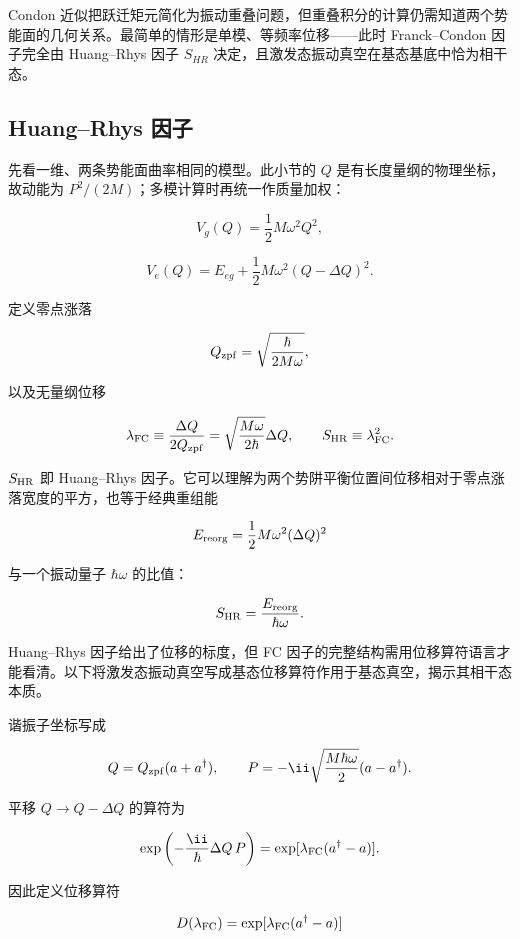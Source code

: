 Condon 近似把跃迁矩元简化为振动重叠问题，但重叠积分的计算仍需知道两个势能面的几何关系。最简单的情形是单模、等频率位移——此时 Franck--Condon 因子完全由 Huang--Rhys 因子 $S_{HR}$ 决定，且激发态振动真空在基态基底中恰为相干态。

\subsection{Huang--Rhys 因子}
先看一维、两条势能面曲率相同的模型。此小节的 $Q$ 是有长度量纲的物理坐标，故动能为 $P^2/(2M)$；多模计算时再统一作质量加权：

\[
V_g(Q)=\frac12M\omega^2Q^2,
\]

\[
V_e(Q)=E_{eg}+\frac12M\omega^2(Q-\Delta Q)^2.
\]

定义零点涨落

\[
Q_{\rm zpf}=\sqrt{\frac{\hbar}{2M\omega}},
\]

以及无量纲位移

\begin{equation}
\lambda_{\rm FC}
\equiv\frac{\Delta Q}{2Q_{\rm zpf}}
=\sqrt{\frac{M\omega}{2\hbar}}\Delta Q,
\qquad
S_{\rm HR}\equiv\lambda_{\rm FC}^2.
\label{eq:huang-rhys}
\end{equation}

\(S_{\rm HR}\) 即 Huang--Rhys 因子。它可以理解为两个势阱平衡位置间位移相对于零点涨落宽度的平方，也等于经典重组能

\[
E_{\rm reorg}=\frac12M\omega^2(\Delta Q)^2
\]

与一个振动量子 \(\hbar\omega\) 的比值：

\[
S_{\rm HR}=\frac{E_{\rm reorg}}{\hbar\omega}.
\]

Huang--Rhys 因子给出了位移的标度，但 FC 因子的完整结构需用位移算符语言才能看清。以下将激发态振动真空写成基态位移算符作用于基态真空，揭示其相干态本质。

谐振子坐标写成

\[
Q=Q_{\rm zpf}(a+a^\dagger),
\qquad
P=-\ii\sqrt{\frac{M\hbar\omega}{2}}(a-a^\dagger).
\]

平移 \(Q\to Q-\Delta Q\) 的算符为

\[
\exp\left(-\frac{\ii}{\hbar}\Delta Q\,P\right)
=\exp[\lambda_{\rm FC}(a^\dagger-a)].
\]

因此定义位移算符

\begin{equation}
D(\lambda_{\rm FC})
=\exp[\lambda_{\rm FC}(a^\dagger-a)]
\label{eq:displacement-operator-fc}
\end{equation}

